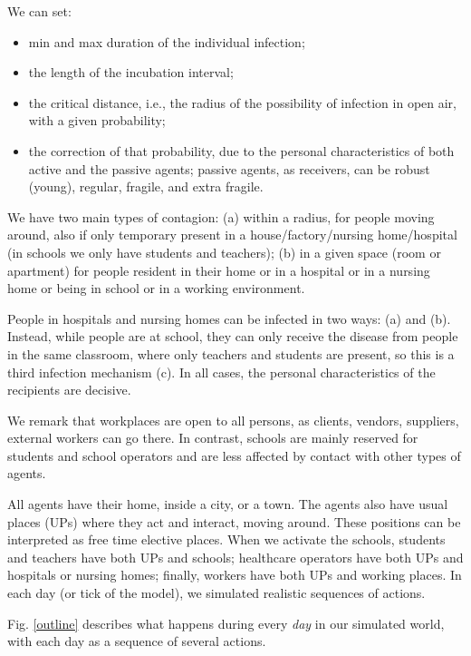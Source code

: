 \documentclass[graybox]{svmult}
\begin{document}
We can set: 
\begin{itemize}
\item min and max duration of the individual infection;

\item the length of the incubation interval;

\item the critical distance, i.e., the radius of the possibility of infection in open air, with a given probability;

\item the correction of that probability, due to the personal characteristics of both active and the passive agents; passive agents, as receivers, can be robust (young), regular, fragile, and extra fragile.

\end{itemize} 

We have two main types of contagion: (a) within a radius, for people moving around, also if only temporary present in a house/factory/nursing home/hospital (in schools we only have students and teachers); (b) in a given space (room or apartment) for people resident in their home or in a hospital or in a nursing home or being in school or in a working environment.

People in hospitals and nursing homes can be infected in two ways: (a) and (b). Instead, while people are at school, they can only receive the disease from people in the same classroom, where only teachers and students are present, so this is a third infection mechanism (c). In all cases, the personal characteristics of the recipients are decisive.

We remark that workplaces are open to all persons, as clients, vendors, suppliers, external workers can go there. In contrast, schools are mainly reserved for students and school operators and are less affected by contact with other types of agents.

All agents have their home, inside a city, or a town. The agents also have usual places (UPs) where they act and interact, moving around. These positions can be interpreted as free time elective places. When we activate the schools, students and teachers have both UPs and schools; healthcare operators have both UPs and hospitals or nursing homes; finally, workers have both UPs and working places. In each day (or tick of the model), we simulated realistic sequences of actions.




Fig. \ref{outline} describes what happens during every \emph{day} in our simulated world, with each day as a sequence of several actions.
\end{document}
